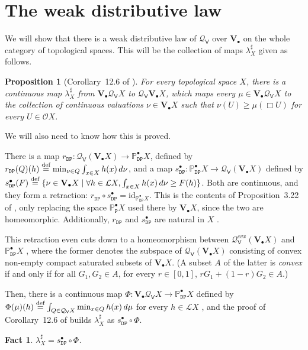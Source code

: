 \documentclass[preprint,12pt]{elsarticle}
\newcommand\eqdef{\mathrel{\buildrel \text{def}\over=}}
\newcommand\Lform{\mathcal L}
\newcommand\identity[1]{\mathrm{id}_{#1}}
\newcommand\Pred{\mathbb{P}}
\newcommand\Demon{{\mathtt{D}}}
\newcommand\Nature{{\mathtt{P}}}
\newcommand\DN{{\Demon\Nature}}
\newcommand\Smyth{{\mathcal Q}}
\newcommand\Vt{\mathsf{V}}
\newcommand\SV{\Smyth_{\Vt}}
\newcommand\Val{{\mathbf V}}
\newcommand\Open{{\mathcal O}}
\newtheorem{proposition}[theorem]{Proposition}
\newtheorem{fact}[theorem]{Fact}
\begin{document}
\section{The weak distributive law}
\label{sec:weak-distr-law}


We will show that there is a weak distributive law of $\SV$ over
$\Val_\bullet$ on the whole category of topological spaces.
This will be the collection of maps ${\lambda^\sharp_X}$ given as follows.
\begin{proposition}[Corollary~12.6 of \cite{JGL:projlim:prev}]
  \label{prop:Phi}
  For every topological space $X$, there is a continuous map
  ${\lambda^\sharp_X}$ from $\Val_\bullet {\SV X}$ to $\SV {\Val_\bullet X}$,
  which maps every $\mu \in \Val_\bullet {\SV X}$ to the collection of
  continuous valuations $\nu \in \Val_\bullet X$ such that
  $\nu (U) \geq \mu (\Box U)$ for every $U \in \Open X$.
\end{proposition}

We will also need to know how this is proved.

There is a map
$r_\DN \colon \SV (\Val_\bullet X) \to \Pred_{\DN}^\bullet X$, defined
by
$r_\DN (Q) (h) \eqdef \min_{\nu \in Q} \allowbreak \int_{x \in X} h
(x)\,d\nu$, and a map
$s_\DN^\bullet \colon \Pred_{\DN}^\bullet X \to \SV (\Val_\bullet X)$
defined by
$s_\DN^\bullet (F) \eqdef \{\nu \in \Val_\bullet X \mid \forall h \in
\Lform X, \int_{x \in X} h (x) \,d\nu \geq F (h)\}$.  Both are
continuous, and they form a retraction:
$r_\DN \circ s_\DN^\bullet = \identity {\Pred_{\DN}^\bullet X}$.  This
is the contents of Proposition~3.22 of \cite{JGL-mscs16}, only
replacing the space $\Pred_\Nature^\bullet X$ used there by
$\Val_\bullet X$, since the two are homeomorphic.  Additionally,
$r_\DN$ and $s_\DN^\bullet$ are natural in $X$ \cite[Lemma
11.2]{JGL:projlim:prev}.

This retraction even cuts down to a homeomorphism between
$\SV^{cvx} (\Val_\bullet X)$ and $\Pred_\DN^\bullet X$
\cite[Theorem~4.15]{JGL-mscs16}, where the former denotes the subspace
of $\SV (\Val_\bullet X)$ consisting of convex non-empty compact
saturated subsets of $\Val_\bullet X$.  (A subset $A$ of the latter is
\emph{convex} if and only if for all $G_1, G_2 \in A$, for every
$r \in [0, 1]$, $r G_1 + (1-r) G_2 \in A$.)

Then, there is a continuous map
$\Phi \colon \Val_\bullet {\SV X} \to \Pred_\DN^\bullet X$ defined by
$\Phi (\mu) (h) \eqdef \int_{Q \in \SV X} \min_{x \in Q} h (x) \,d\mu$
for every $h \in \Lform X$ \cite[Lemma 12.5]{JGL:projlim:prev}, and
the proof of Corollary~12.6 of \cite{JGL:projlim:prev} builds
${\lambda^\sharp_X}$ as $s_\DN^\bullet \circ \Phi$.
\begin{fact}
  \label{fact:lambda}
  ${\lambda^\sharp_X} = s_\DN^\bullet \circ \Phi$.
\end{fact}
\end{document}
